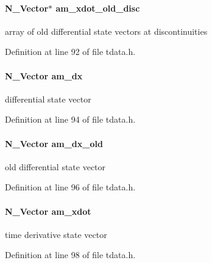 \paragraph[{am\+\_\+xdot\+\_\+old\+\_\+disc}]{\setlength{\rightskip}{0pt plus 5cm}N\+\_\+\+Vector$\ast$ am\+\_\+xdot\+\_\+old\+\_\+disc}\label{struct_temp_data_aae23888e89a7bd3c65a22784acaa1328}
array of old differential state vectors at discontinuities 

Definition at line 92 of file tdata.\+h.

\hypertarget{struct_temp_data_ac10ec733609d33c557d48c1cc4c9f6f1}{}
\paragraph[{am\+\_\+dx}]{\setlength{\rightskip}{0pt plus 5cm}N\+\_\+\+Vector am\+\_\+dx}\label{struct_temp_data_ac10ec733609d33c557d48c1cc4c9f6f1}
differential state vector 

Definition at line 94 of file tdata.\+h.

\hypertarget{struct_temp_data_aca2465f16eeb5dc94cea61c970f2682a}{}
\paragraph[{am\+\_\+dx\+\_\+old}]{\setlength{\rightskip}{0pt plus 5cm}N\+\_\+\+Vector am\+\_\+dx\+\_\+old}\label{struct_temp_data_aca2465f16eeb5dc94cea61c970f2682a}
old differential state vector 

Definition at line 96 of file tdata.\+h.

\hypertarget{struct_temp_data_abad4a9e3cc9cd42b3fe4e2fe28a915c1}{}
\paragraph[{am\+\_\+xdot}]{\setlength{\rightskip}{0pt plus 5cm}N\+\_\+\+Vector am\+\_\+xdot}\label{struct_temp_data_abad4a9e3cc9cd42b3fe4e2fe28a915c1}
time derivative state vector 

Definition at line 98 of file tdata.\+h.

\hypertarget{struct_temp_data_a6a8af565a7f6ec58c4fbcd044c049d80}{}

